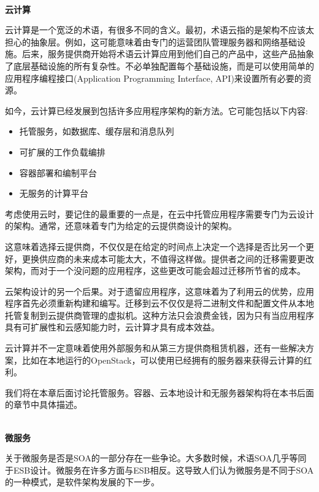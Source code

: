 \hspace*{\fill} \\ %
\noindent
\textbf{云计算}

云计算是一个宽泛的术语，有很多不同的含义。最初，术语云指的是架构不应该太担心的抽象层。例如，这可能意味着由专门的运营团队管理服务器和网络基础设施。后来，服务提供商开始将术语云计算应用到他们自己的产品中，这些产品抽象了底层基础设施的所有复杂性。不必单独配置每个基础设施，而是可以使用简单的应用程序编程接口(Application Programming Interface, API)来设置所有必要的资源。

如今，云计算已经发展到包括许多应用程序架构的新方法。它可能包括以下内容:

\begin{itemize}
\item 
托管服务，如数据库、缓存层和消息队列

\item 
可扩展的工作负载编排

\item 
容器部署和编制平台

\item 
无服务的计算平台
\end{itemize}

考虑使用云时，要记住的最重要的一点是，在云中托管应用程序需要专门为云设计的架构。通常，还意味着专门为给定的云提供商设计的架构。

这意味着选择云提供商，不仅仅是在给定的时间点上决定一个选择是否比另一个更好，更换供应商的未来成本可能太大，不值得这样做。提供者之间的迁移需要更改架构，而对于一个没问题的应用程序，这些更改可能会超过迁移所节省的成本。

云架构设计的另一个后果。对于遗留应用程序，这意味着为了利用云的优势，应用程序首先必须重新构建和编写。迁移到云不仅仅是将二进制文件和配置文件从本地托管复制到云提供商管理的虚拟机。这种方法只会浪费金钱，因为只有当应用程序具有可扩展性和云感知能力时，云计算才具有成本效益。

云计算并不一定意味着使用外部服务和从第三方提供商租赁机器，还有一些解决方案，比如在本地运行的OpenStack，可以使用已经拥有的服务器来获得云计算的红利。

我们将在本章后面讨论托管服务。容器、云本地设计和无服务器架构将在本书后面的章节中具体描述。

\hspace*{\fill} \\ %
\noindent
\textbf{微服务}

关于微服务是否是SOA的一部分存在一些争论。大多数时候，术语SOA几乎等同于ESB设计。微服务在许多方面与ESB相反。这导致人们认为微服务是不同于SOA的一种模式，是软件架构发展的下一步。

